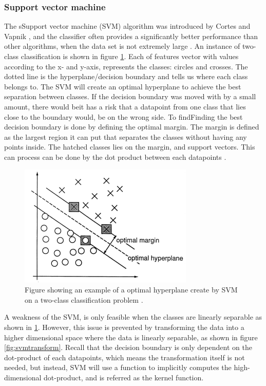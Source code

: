 \documentclass[USenglish]{ifimaster}  %
\begin{document}
\subsubsection{Support vector machine}
The sSupport vector machine (SVM) algorithm was introduced by Cortes and Vapnik \cite{Cortes1995}, and the  classifier often provides a significantly better performance than other algorithms, when the data set is not extremely large \cite{Marsland:2009:MLA:1571643}. An instance of two-class classification is shown in figure \ref{fig:SVM}. Each of features vector with values according to the x- and y-axis, represents the classes: circles and crosses. The dotted line is the hyperplane/decision boundary and tells us where each class belongs to. The SVM will create an optimal hyperplane to achieve the best separation between classes. If the decision boundary was moved with by a small amount, there would beit has a risk that a datapoint from one class that lies close to the boundary would, be on the wrong side. To findFinding the best decision boundary is done by defining the optimal margin. The margin is defined as the largest region it can put that separates the classes without having any points inside. The hatched classes lies on the margin, and support vectors. This can process can be done by the dot product between each datapoints \cite{Cortes1995}.

\begin{figure}[h]
	\centering
	\includegraphics{Figures/SVM.PNG}
	\caption{Figure showing an example of a optimal hyperplane create by SVM on a two-class classification problem  \cite{Cortes1995}.}
	\label{fig:SVM}
\end{figure}
\FloatBarrier

A weakness of the SVM, is only feasible when the classes are linearly separable as shown in \ref{fig:SVM}. However, this issue is prevented by transforming the data into a higher dimensional space where the data is linearly separable, as shown in figure \ref{fig:svmtransform}. Recall that the decision boundary is only dependent on the dot-product of each datapoints, which means the transformation itself is not needed, but instead, SVM will use a function to implicitly computes the high-dimensional dot-product, and is referred as the kernel function.
	
\end{document}
